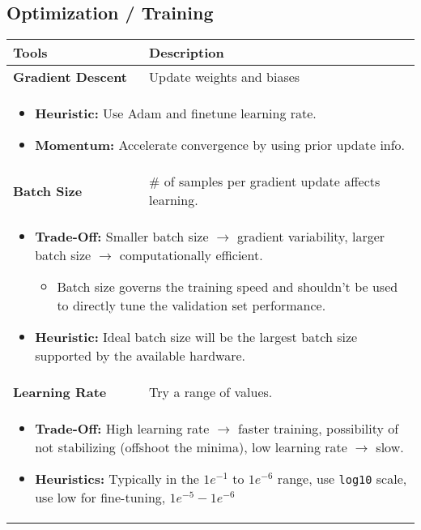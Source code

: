 \subsection{Optimization / Training}
\begin{summary}
    \begin{center}
        \begin{tabular}{ll}
        \toprule
        \textbf{Tools} & \textbf{Description} \\
        \midrule
        \textbf{Gradient Descent} & Update weights and biases \\
        \multicolumn{2}{p{\linewidth}}{
        \begin{itemize}
            \item \textbf{Heuristic:} Use Adam and finetune learning rate.
            \item \textbf{Momentum:} Accelerate convergence by using prior update info. 
        \end{itemize}} \\
        \midrule
        \textbf{Batch Size} & \# of samples per gradient update affects learning. \\
        \multicolumn{2}{p{\linewidth}}{
        \begin{itemize}
            \item \textbf{Trade-Off:} Smaller batch size $\rightarrow$ gradient variability, larger batch size $\rightarrow$ computationally efficient.
            \begin{itemize}
                \item Batch size governs the training speed and shouldn't be used to directly tune the validation set performance. 
            \end{itemize}
            \item \textbf{Heuristic:} Ideal batch size will be the largest batch size supported by the available hardware.
        \end{itemize}} \\
        \midrule
        \textbf{Learning Rate} & Try a range of values. \\
        \multicolumn{2}{p{\linewidth}}{
        \begin{itemize}
            \item \textbf{Trade-Off:} High learning rate $\rightarrow$ faster training, possibility of not stabilizing (offshoot the minima), low learning rate $\rightarrow$ slow.  
            \item \textbf{Heuristics:} Typically in the $1e^{-1}$ to $1e^{-6}$ range, use \texttt{log10} scale, use low for fine-tuning, $1e^{-5} - 1e^{-6}$

\end{itemize}}
\end{tabular}
\end{center}
\end{summary}
